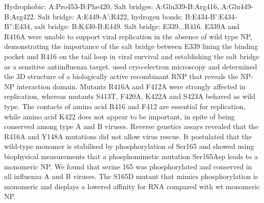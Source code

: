 \citep{1140} Hydrophobic: A:Pro453-B:Phe420, Salt bridges: A:Glu339-B:Arg416, A:Glu449-B:Arg422.
\citep{1231} Salt bridge: A:E449-A':R422, hydrogen bonds: B:E434-B':E434-B'':E434, salt bridge: B:K430-B:E449.
\citep{1233} Salt bridge: E339...R416. E339A and R416A were unable to support viral replication in the absence of wild type NP, demonstrating the importance of the salt bridge between E339 lining the binding pocket and R416 on the tail loop in viral survival and establishing the salt bridge as a sensitive antiinfluenza target.
\citep{1447} used cryo-electron microscopy and determined the 3D structure of a biologically active recombinant RNP that reveals the NP-NP interaction domain. Mutants R416A and F412A were strongly affected in replication, whereas mutants S413T, F420A, K422A and S423A behaved as wild type. The contacts of amino acid R416 and F412 are essential for replication, while amino acid K422 does not appear to be important, in spite of being conserved among type A and B viruses.
\citep{1574} Reverse genetics assays revealed that the R416A and Y148A mutations did not allow virus rescue.%
\citep{1573} It postulated that the wild-type monomer is stabilised by phosphorylation of Ser165 and showed using biophysical measurements that a phosphomimetic mutation Ser165Asp leads to a monomeric NP. We found that serine 165 was phosphorylated and conserved in all influenza A and B viruses. The S165D mutant that mimics phosphorylation is monomeric and displays a lowered affinity for RNA compared with wt monomeric NP.%

